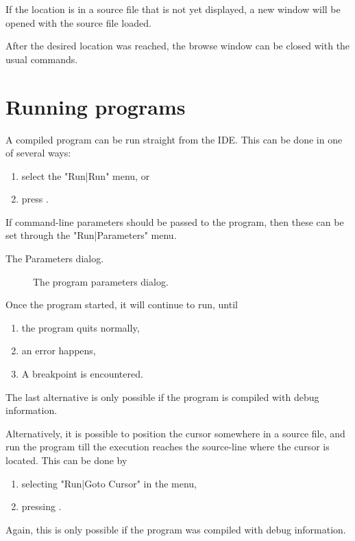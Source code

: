 If the location is in a source file that is not yet displayed, a new 
window will be opened with the source file loaded.

After the desired location was reached, the browse window can be closed 
with the usual commands. 

\section{Running programs}
\label{se:running}
A compiled program can be run straight from the IDE. This can be done
in one of several ways:
\begin{enumerate}
\item select the "Run|Run" menu, or
\item press .
\end{enumerate}
If command-line parameters should be passed to the program, then these
can be set through the "Run|Parameters" menu. 
\begin{htmlonly}
The Parameters dialog.
\end{htmlonly}
\begin{latexonly}
\begin{figure}[h]
\caption{The program parameters dialog.}
\label{fig:ides}
\ifpdf
{}
\else
{}
\fi
\end{figure}
\end{latexonly}

Once the program started, it will continue to run, until 
\begin{enumerate}
\item the program quits normally,
\item an error happens,
\item A breakpoint is encountered.
\end{enumerate}
The last alternative is only possible if the program is compiled
with debug information.

Alternatively, it is possible to position the cursor somewhere in a
source file, and run the program till the execution reaches the
source-line where the cursor is located. This can be done by
\begin{enumerate}
\item selecting "Run|Goto Cursor" in the menu,
\item pressing .
\end{enumerate}
Again, this is only possible if the program was compiled with debug
information.

